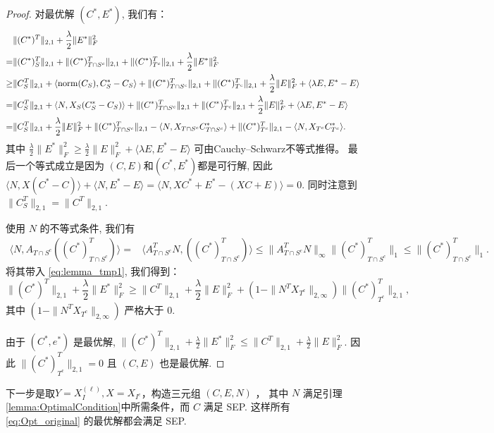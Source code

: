 \documentclass{ctexart}
\begin{document}
\begin{proof}
  对最优解 $(C^{*},E^{*})$, 我们有：
  \begin{align}
    &\|(C^*)^T\|_{2,1}+\frac{\lambda}{2}\|E^*\|_F^2 \nonumber\\
    =& \|(C^*)^T_S\|_{2,1}+\|(C^*)^T_{T\cap
    S^c}\|_{2,1}+\|(C^*)^T_{T^c}\|_{2,1} + \frac{\lambda}{2} \|E^*\|^2_F\nonumber\\
    \geq&\|C^T_S\|_{2,1}+\langle \mathrm{norm}(C_S),C^*_S-C_S\rangle+\|(C^*)^T_{T\cap
    S^c}\|_{2,1}+\|(C^*)^T_{T^c}\|_{2,1} + \frac{\lambda}{2} \|E\|^2_F +\langle
    \lambda E,E^*-E\rangle\nonumber\\
    =&\|C^T_S\|_{2,1}+\langle N,X_S(C^*_S-C_S)\rangle+\|(C^*)^T_{T\cap
    S^c}\|_{2,1}+\|(C^*)^T_{T^c}\|_{2,1} + \frac{\lambda}{2} \|E\|^2_F +\langle
    \lambda E,E^*-E\rangle\nonumber\\
    =&\|C^T_S\|_{2,1}+\frac{\lambda}{2} \|E\|_F^2+ \|(C^*)^T_{T\cap
    S^c}\|_{2,1}-\langle N,X_{T\cap S^c}C^*_{T\cap S^c}\rangle
    +\|(C^*)^T_{T^c}\|_{2,1}-\langle N,X_{T^c}C^*_{T^c}\rangle. \label{eq:lemma_tmp1}
  \end{align}
  其中 $\frac{\lambda}{2} \|E^*\|_F^2 \geq \frac{\lambda}{2} \|E\|_F^2 +\langle
  \lambda E,E^*-E\rangle$ 可由Cauchy–Schwarz不等式推得。
  最后一个等式成立是因为 $(C,E)$和$(C^*,E^*)$都是可行解, 因此$\langle
  N,X(C^*-C)\rangle+\langle N,E^*-E\rangle = \langle
  N,XC^*+E^*-(XC+E)\rangle=0$. 同时注意到 $\| C^T_S\|_{2, 1} = \|C^T\|_{2, 1}$.

  使用 $N$ 的不等式条件, 我们有
  \begin{align*}
    \langle N,A_{T\cap S^c}((C^*)^T_{T\cap S^c})\rangle=&\langle A_{T\cap S^c}^TN,((C^*)^T_{T\cap S^c})\rangle
    \leq \|A^T_{T\cap S^{c}}N\|_{\infty}\|(C^*)^T_{T\cap S^c}\|_1\leq\|(C^*)^T_{T\cap S^c}\|_1.
  \end{align*}
  将其带入 \eqref{eq:lemma_tmp1}, 我们得到：
  \begin{equation*}
    \|(C^*)^T\|_{2,1}+\frac{\lambda}{2} \|E^*\|^2_F \geq \|C^T\|_{2,1}+ \frac{\lambda}{2} 
    \|E\|_F^2 +(1-\|N^T X_{T^{c}}\|_{2, \infty})\|(C^*)^T_{T^c}\|_{2,1},
  \end{equation*}
  其中 $(1-\|N^T X_{T^{c}}\|_{2, \infty})$ 严格大于 $0$.

  由于 $(C^*,e^*)$ 是最优解, $\|(C^*)^T\|_{2,1}+\frac{\lambda}{2}
  \|E^*\|_F^2\leq \|C^T\|_{2, 1}+\frac{\lambda}{2} \|E\|_F^2$. 
  因此 $\|(C^*)^T_{T^c}\|_{2,1}=0$ 且 $(C,E)$ 也是最优解.
\end{proof}

下一步是取$Y=X_I^{(\ell)}, X=X_{I^c}$，构造三元组 $(C,E,N)$ ，
其中 $N$ 满足引理\ref{lemma:OptimalCondition}中所需条件，而 $C$ 满足 SEP. 
这样所有 \eqref{eq:Opt_original} 的最优解都会满足 SEP.
\end{document}
